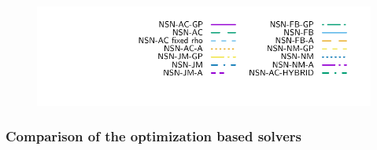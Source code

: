 \begin{frame}
\begin{figure}
   \\
{\includegraphics[height=\legendheight]{figure/NSN/1.0e-08/50/time/profile-Chain_legend.pdf}} 
  \label{fig:NSN}
\end{figure}
\end{frame}
\begin{frame}
  \frametitle{{Comparison of the optimization based solvers}}
  

\end{frame}
